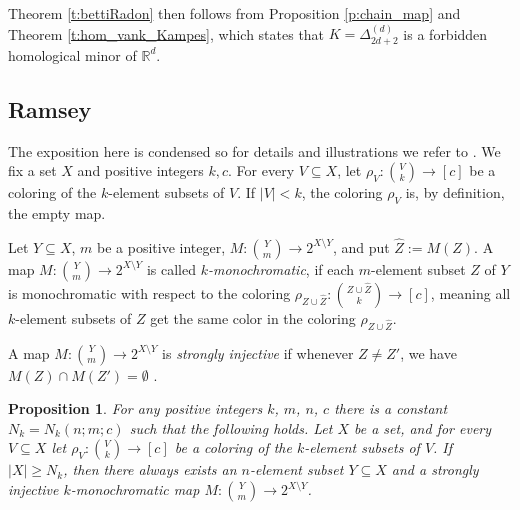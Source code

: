 \documentclass[a4paper,12pt]{amsart}
\newtheorem{proposition}[theorem]{Proposition}
\theoremstyle{definition}
\begin{document}
Theorem \ref{t:bettiRadon} then follows from Proposition \ref{p:chain_map} and Theorem \ref{t:hom_vank_Kampes}, which states that $K = \Delta^{(d)}_{2d+2}$ is a forbidden homological minor of $\mathbb R^d$.

\subsection{Ramsey}\label{sec:ramsey}

 The exposition here is condensed so for details and illustrations we refer to \cite[Section 3.3]{bettiRadon}. 
We fix a set $X$ and positive integers $k, c$.
 For every $V\subseteq X$, let $\rho_V \colon \binom{V}{k}\to [c]$ be a coloring of the $k$-element subsets of $V$. If $|V|<k$,  the coloring $\rho_V$ is, by definition, the empty map.

Let $Y \subseteq X$, $m$ be a positive integer, $M: \binom{Y}{m} \to 2^{X\setminus Y}$, and put $\widehat Z := M(Z)$.
A map $M \colon \binom{Y}{m} \to 2^{X\setminus Y}$ is called \emph{$k$-monochromatic}, if each $m$-element subset $Z$ of $Y$ is monochromatic with respect to the coloring $\rho_{Z \cup \widehat Z} : \binom{Z \cup \widehat Z}{k} \to [c]$, meaning all $k$-element subsets of $Z$ get the same color in the coloring $\rho_{Z \cup \widehat Z}$. 


A map $M: \binom{Y}{m} \to 2^{X\setminus Y}$ is \emph{strongly injective} if whenever $Z \neq Z'$, we have $M(Z) \cap M(Z') = \emptyset$ .


\begin{proposition}\cite[Prop. 3.9]{bettiRadon}\label{p:ramsey_selection}
 For any positive integers $k$, $m$, $n$, $c$ there is a constant $N_k=N_k(n;m;c)$ such that the following holds. Let $X$ be a set, and for every $V
\subseteq X$ let $\rho_V \colon \binom{V}{k}\to [c]$ be a coloring of the $k$-element subsets of
$V$. If $|X| \geq N_k$, then there always exists an $n$-element subset $Y \subseteq X$ and a strongly injective $k$-monochromatic map $M: \binom{Y}{m} \to 2^{X\setminus Y}$.
\end{proposition}
\end{document}
